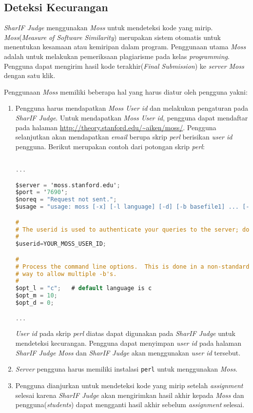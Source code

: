 \subsection{Deteksi Kecurangan}
\textit{SharIF Judge} menggunakan \textit{Moss} untuk mendeteksi kode yang mirip. \textit{Moss}(\textit{Measure of Software Similarity}) merupakan sistem otomatis untuk menentukan kesamaan atau kemiripan dalam program. Penggunaan utama \textit{Moss} adalah untuk melakukan pemeriksaan plagiarisme pada kelas \textit{programming}. Pengguna dapat mengirim hasil kode terakhir(\textit{Final Submission}) ke \textit{server Moss} dengan satu klik.

Penggunaan \textit{Moss} memiliki beberapa hal yang harus diatur oleh pengguna yakni:

\begin{enumerate}
\item Pengguna harus mendapatkan \textit{Moss User id} dan melakukan pengaturan pada \textit{SharIF Judge}. Untuk mendapatkan \textit{Moss User id}, pengguna dapat mendaftar pada halaman \url{http://theory.stanford.edu/~aiken/moss/}. Pengguna selanjutkan akan mendapatkan \textit{email} berupa skrip \textit{perl} berisikan \textit{user id} pengguna. Berikut merupakan contoh dari potongan skrip \textit{perl}:

\begin{lstlisting}[language=C,caption=Contoh potongan skrip \textit{perl}, label=kode:perlexample]

...

$server = 'moss.stanford.edu';
$port = '7690';
$noreq = "Request not sent.";
$usage = "usage: moss [-x] [-l language] [-d] [-b basefile1] ... [-b basefilen] [-m #] [-c \"string\"] file1 file2 file3 ...";

#
# The userid is used to authenticate your queries to the server; don't change it!
#
$userid=YOUR_MOSS_USER_ID;

#
# Process the command line options.  This is done in a non-standard
# way to allow multiple -b's.
#
$opt_l = "c";   # default language is c
$opt_m = 10;
$opt_d = 0;

...

\end{lstlisting}
\textit{User id} pada skrip \textit{perl} diatas dapat digunakan pada \textit{SharIF Judge} untuk mendeteksi kecurangan. Pengguna dapat menyimpan \textit{user id} pada halaman \textit{SharIF Judge Moss} dan \textit{SharIF Judge} akan menggunakan \textit{user id} tersebut.

\item \textit{Server} pengguna harus memiliki instalasi \verb|perl| untuk menggunakan \textit{Moss}.
\item Pengguna dianjurkan untuk mendeteksi kode yang mirip setelah \textit{assignment} selesai karena \textit{SharIF Judge} akan mengirimkan hasil akhir kepada \textit{Moss} dan pengguna(\textit{students}) dapat mengganti hasil akhir sebelum \textit{assignment} selesai.

\end{enumerate}

